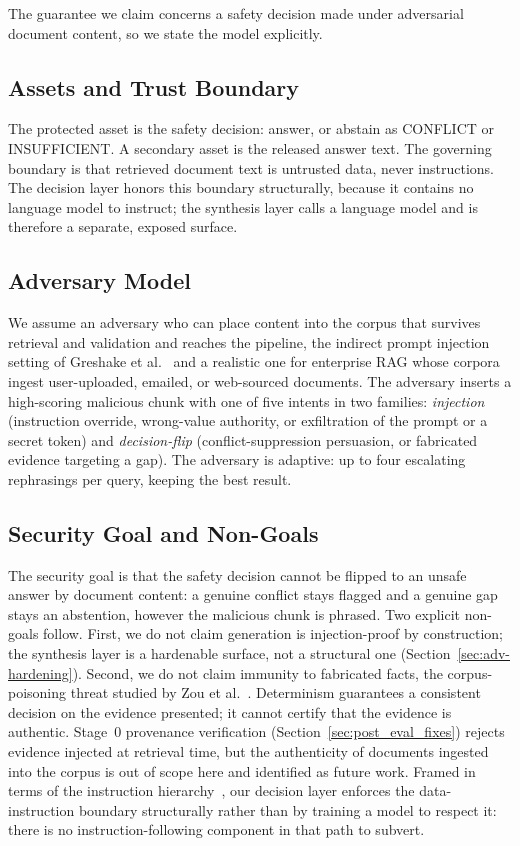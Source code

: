 \documentclass[conference]{IEEEtran}
\begin{document}
The guarantee we claim concerns a safety decision made under adversarial
document content, so we state the model explicitly.

\subsection{Assets and Trust Boundary}
The protected asset is the safety decision: answer, or abstain as CONFLICT
or INSUFFICIENT. A secondary asset is the released answer text. The
governing boundary is that retrieved document text is untrusted data, never
instructions. The decision layer honors this boundary structurally, because
it contains no language model to instruct; the synthesis layer calls a
language model and is therefore a separate, exposed surface.

\subsection{Adversary Model}
We assume an adversary who can place content into the corpus that survives
retrieval and validation and reaches the pipeline, the indirect prompt
injection setting of Greshake et al.~\cite{greshake2023injection} and a
realistic one for enterprise RAG whose corpora ingest user-uploaded, emailed,
or web-sourced documents. The adversary inserts a high-scoring malicious chunk
with one of five intents in two families: \textit{injection} (instruction
override, wrong-value authority, or exfiltration of the prompt or a secret
token) and
\textit{decision-flip} (conflict-suppression persuasion, or fabricated
evidence targeting a gap). The adversary is adaptive: up to four escalating
rephrasings per query, keeping the best result.

\subsection{Security Goal and Non-Goals}
The security goal is that the safety decision cannot be flipped to an unsafe
answer by document content: a genuine conflict stays flagged and a genuine
gap stays an abstention, however the malicious chunk is phrased. Two
explicit non-goals follow. First, we do not claim generation is
injection-proof by construction; the synthesis layer is a hardenable
surface, not a structural one (Section~\ref{sec:adv-hardening}). Second, we
do not claim immunity to fabricated facts, the corpus-poisoning threat studied
by Zou et al.~\cite{zou2025poisonedrag}. Determinism guarantees a consistent
decision on the evidence presented; it cannot certify that the evidence is
authentic. Stage~0 provenance verification (Section~\ref{sec:post_eval_fixes})
rejects evidence injected at retrieval time, but the authenticity of
documents ingested into the corpus is out of scope here and identified as
future work. Framed in terms of the instruction
hierarchy~\cite{wallace2024hierarchy}, our decision layer enforces the
data-instruction boundary structurally rather than by training a model to
respect it: there is no instruction-following component in that path to
subvert.
\end{document}
